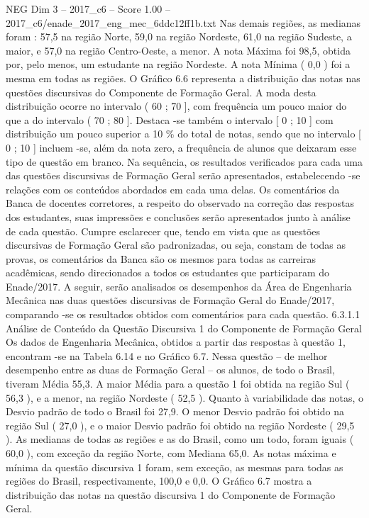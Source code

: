 \begin{textsample}{NEG Dim 3 – 2017\_c6 – Score 1.00 – 2017\_c6/enade\_2017\_eng\_mec\_6ddc12ff1b.txt}
Nas demais regiões, as medianas foram : 57,5 na região Norte, 59,0 na região Nordeste, 61,0 na região Sudeste, a maior, e 57,0 na região Centro-Oeste, a menor.
A nota Máxima foi 98,5, obtida por, pelo menos, um estudante na região Nordeste.
A nota Mínima ( 0,0 ) foi a mesma em todas as regiões.
O Gráfico 6.6 representa a distribuição das notas nas questões discursivas do Componente de Formação Geral.
A moda desta distribuição ocorre no intervalo ( 60 ; 70 ], com frequência um pouco maior do que a do intervalo ( 70 ; 80 ].
Destaca -se também o intervalo [ 0 ; 10 ] com distribuição um pouco superior a 10 \% do total de notas, sendo que no intervalo [ 0 ; 10 ] incluem -se, além da nota zero, a frequência de alunos que deixaram esse tipo de questão em branco.
Na sequência, os resultados verificados para cada uma das questões discursivas de Formação Geral serão apresentados, estabelecendo -se relações com os conteúdos abordados em cada uma delas.
Os comentários da Banca de docentes corretores, a respeito do observado na correção das respostas dos estudantes, suas impressões e conclusões serão apresentados junto à análise de cada questão.
Cumpre esclarecer que, tendo em vista que as questões discursivas de Formação Geral são padronizadas, ou seja, constam de todas as provas, os comentários da Banca são os mesmos para todas as carreiras acadêmicas, sendo direcionados a todos os estudantes que participaram do Enade/2017.
A seguir, serão analisados os desempenhos da Área de Engenharia Mecânica nas duas questões discursivas de Formação Geral do Enade/2017, comparando -se os resultados obtidos com comentários para cada questão. 6.3.1.1 Análise de Conteúdo da Questão Discursiva 1 do Componente de Formação Geral Os dados de Engenharia Mecânica, obtidos a partir das respostas à questão 1, encontram -se na Tabela 6.14 e no Gráfico 6.7.
Nessa questão – de melhor desempenho entre as duas de Formação Geral – os alunos, de todo o Brasil, tiveram Média 55,3.
A maior Média para a questão 1 foi obtida na região Sul ( 56,3 ), e a menor, na região Nordeste ( 52,5 ).
Quanto à variabilidade das notas, o Desvio padrão de todo o Brasil foi 27,9.
O menor Desvio padrão foi obtido na região Sul ( 27,0 ), e o maior Desvio padrão foi obtido na região Nordeste ( 29,5 ).
As medianas de todas as regiões e as do Brasil, como um todo, foram iguais ( 60,0 ), com exceção da região Norte, com Mediana 65,0.
As notas máxima e mínima da questão discursiva 1 foram, sem exceção, as mesmas para todas as regiões do Brasil, respectivamente, 100,0 e 0,0.
O Gráfico 6.7 mostra a distribuição das notas na questão discursiva 1 do Componente de Formação Geral.

\end{textsample}
